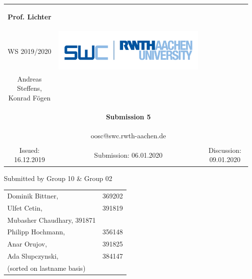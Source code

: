 \begin{tabular}{ccc}
		\begin{large} \textbf{Prof. Lichter} \end{large} &
		
		\begin{minipage}[H]{3.5cm}
			\centering
			\begin{large} OOSC \end{large} \\
			\begin{large} WS 2019/2020 \end{large}
		\end{minipage} &
		
		\begin{minipage}[H]{4cm}
			\includegraphics[keepaspectratio,width=\textwidth,angle=0]{images/swc.png}
		\end{minipage} \\
		Andreas Steffens, Konrad F\"ogen &  &  \\
		& \begin{huge} \textbf{Submission 5} \end{huge}&  \\
		& oosc@swc.rwth-aachen.de &  \\
		& & \\
		Issued: 16.12.2019 &
		Submission: 06.01.2020 &
		Discussion: 09.01.2020 \\
	\end{tabular}
	\newline \newline \newline
	\begin{center}
		Submitted by Group 10 & Group 02
		
		\begin{tabular}{ll}
			Dominik Bittner, & 369202 \\
			Ulfet Cetin, & 391819\\
			Mubasher Chaudhary, 391871 & \\
			Philipp Hochmann, & 356148 \\
			Anar Orujov, & 391825\\
			Ada Slupczynski, & 384147\\
			(sorted on lastname basis)
		\end{tabular}
	\end{center}
